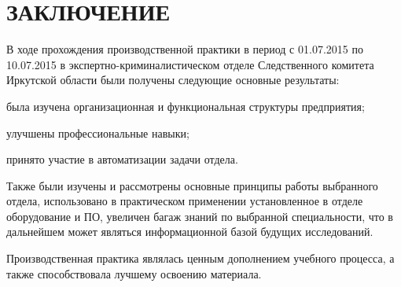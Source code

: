 \section*{ЗАКЛЮЧЕНИЕ}

В ходе прохождения производственной практики в период с 01.07.2015 по 10.07.2015 в экспертно-криминалистическом отделе Следственного комитета Иркутской области были получены следующие основные результаты:
\begin{enumerate*}
	\item была изучена организационная и функциональная структуры предприятия;
	\item улучшены профессиональные навыки;
	\item принято участие в автоматизации задачи отдела.
\end{enumerate*}

Также были изучены и рассмотрены основные принципы работы выбранного отдела, использовано в практическом применении установленное в отделе оборудование и ПО, увеличен багаж знаний по выбранной специальности, что в дальнейшем может являться информационной базой будущих исследований.

Производственная практика являлась ценным дополнением учебного процесса, а также способствовала лучшему освоению материала.
